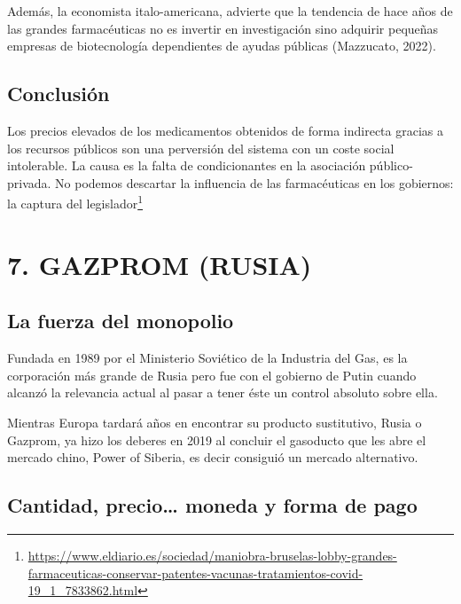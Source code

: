 \documentclass[
]{article}
\begin{document}
Además, la economista italo-americana, advierte que la tendencia de hace
años de las grandes farmacéuticas no es invertir en investigación sino
adquirir pequeñas empresas de biotecnología dependientes de ayudas
públicas (Mazzucato, 2022).

\hypertarget{conclusiuxf3n-2}{%
\subsection*{Conclusión}\label{conclusiuxf3n-2}}

Los precios elevados de los medicamentos obtenidos de forma indirecta
gracias a los recursos públicos son una perversión del sistema con un
coste social intolerable. La causa es la falta de condicionantes en la
asociación público-privada. No podemos descartar la influencia de las
farmacéuticas en los gobiernos: la captura del legislador\footnote{\url{https://www.eldiario.es/sociedad/maniobra-bruselas-lobby-grandes-farmaceuticas-conservar-patentes-vacunas-tratamientos-covid-19_1_7833862.html}}

\hypertarget{gazprom-rusia}{%
\section{7. GAZPROM (RUSIA)}\label{gazprom-rusia}}

\hypertarget{la-fuerza-del-monopolio}{%
\subsection*{La fuerza del monopolio}\label{la-fuerza-del-monopolio}}

Fundada en 1989 por el Ministerio Soviético de la Industria del Gas, es
la corporación más grande de Rusia pero fue con el gobierno de Putin
cuando alcanzó la relevancia actual al pasar a tener éste un control
absoluto sobre ella.

Mientras Europa tardará años en encontrar su producto sustitutivo, Rusia
o Gazprom, ya hizo los deberes en 2019 al concluir el gasoducto que les
abre el mercado chino, Power of Siberia, es decir consiguió un mercado
alternativo.

\hypertarget{cantidad-precio-moneda-y-forma-de-pago}{%
\subsection*{Cantidad, precio\ldots{} moneda y forma de
pago}\label{cantidad-precio-moneda-y-forma-de-pago}}
\end{document}
